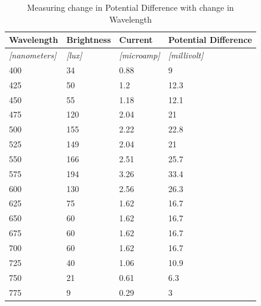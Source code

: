 \documentclass{article}
\begin{document}
\begin{table}[!ht]
\centering
\caption{Measuring change in Potential Difference with change in Wavelength}
\label{my-label}
\begin{tabular}{|l|l|l|l|}
\hline
\textbf{Wavelength}       & \textbf{Brightness} & \textbf{Current}        & \textbf{Potential Difference} \\ \hline
\textit{{[}nanometers{]}} & \textit{{[}lux{]}}  & \textit{{[}microamp{]}} & \textit{{[}millivolt{]}}      \\ \hline
400                       & 34                  & 0.88                    & 9                             \\ \hline
425                       & 50                  & 1.2                     & 12.3                          \\ \hline
450                       & 55                  & 1.18                    & 12.1                          \\ \hline
475                       & 120                 & 2.04                    & 21                            \\ \hline
500                       & 155                 & 2.22                    & 22.8                          \\ \hline
525                       & 149                 & 2.04                    & 21                            \\ \hline
550                       & 166                 & 2.51                    & 25.7                          \\ \hline
575                       & 194                 & 3.26                    & 33.4                          \\ \hline
600                       & 130                 & 2.56                    & 26.3                          \\ \hline
625                       & 75                  & 1.62                    & 16.7                          \\ \hline
650                       & 60                  & 1.62                    & 16.7                          \\ \hline
675                       & 60                  & 1.62                    & 16.7                          \\ \hline
700                       & 60                  & 1.62                    & 16.7                          \\ \hline
725                       & 40                  & 1.06                    & 10.9                          \\ \hline
750                       & 21                  & 0.61                    & 6.3                           \\ \hline
775                       & 9                   & 0.29                    & 3                             \\ \hline
\end{tabular}
\end{table}
\end{document}

